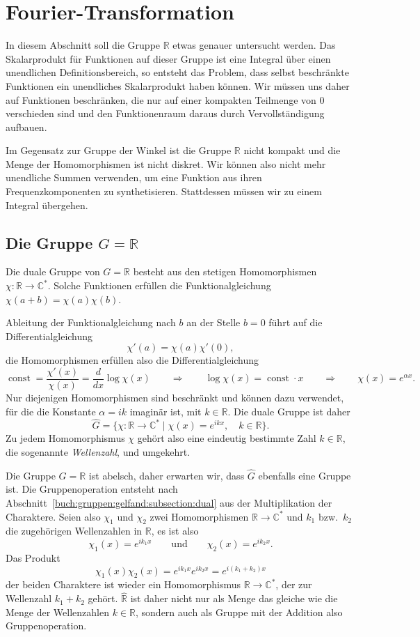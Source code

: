 %
%
%
\section{Fourier-Transformation
\label{buch:gruppen:section:fourier}}
In diesem Abschnitt soll die Gruppe $\mathbb{R}$ etwas genauer untersucht
werden.
Das Skalarprodukt für Funktionen auf dieser Gruppe ist eine Integral über
einen unendlichen Definitionsbereich, so entsteht das Problem, dass
selbst beschränkte Funktionen ein unendliches Skalarprodukt haben können.
Wir müssen uns daher auf Funktionen beschränken, die nur auf einer
kompakten Teilmenge von $0$ verschieden sind und den Funktionenraum
daraus durch Vervollständigung aufbauen.

Im Gegensatz zur Gruppe der Winkel ist die Gruppe $\mathbb{R}$ nicht kompakt
und die Menge der Homomorphismen ist nicht diskret.
Wir können also nicht mehr unendliche Summen verwenden, um eine Funktion
aus ihren Frequenzkomponenten zu synthetisieren.
Stattdessen müssen wir zu einem Integral übergehen.

%
%
\subsection{Die Gruppe $G=\mathbb{R}$
\label{buch:gruppen:fourier:subsection:gruppeR}}
Die duale Gruppe von $G=\mathbb{R}$ besteht aus den stetigen Homomorphismen
$\chi:\mathbb{R}\to\mathbb{C}^*$.
Solche Funktionen erfüllen die Funktionalgleichung $\chi(a+b)=\chi(a)\chi(b)$.

Ableitung der Funktionalgleichung nach $b$ an der Stelle $b=0$ führt auf
die Differentialgleichung
\[
\chi'(a) = \chi(a)\chi'(0),
\]
die Homomorphismen erfüllen also die Differentialgleichung
\[
\operatorname{const}
=
\frac{\chi'(x)}{\chi(x)} 
=
\frac{d}{dx}\log\chi(x)
\qquad\Rightarrow\qquad
\log\chi(x) = \operatorname{const}\cdot x
\qquad\Rightarrow\qquad
\chi(x) = e^{\alpha x}.
\]
Nur diejenigen Homomorphismen sind beschränkt und können dazu verwendet,
für die die Konstante $\alpha=ik$ imaginär ist, mit $k\in\mathbb{R}$.
Die duale Gruppe ist daher
\[
\hat{G}
=
\{
\chi\colon\mathbb{R}\to\mathbb{C}^*
\mid
\chi(x) = e^{ikx},\quad k\in \mathbb{R}
\}.
\]
Zu jedem Homomorphismus $\chi$ gehört also eine eindeutig bestimmte
Zahl $k\in\mathbb{R}$, die sogenannte {\em Wellenzahl},
%
und umgekehrt.

Die Gruppe $G=\mathbb{R}$ ist abelsch, daher erwarten wir, dass 
$\hat{G}$ ebenfalls eine Gruppe ist.
Die Gruppenoperation entsteht nach
Abschnitt~\ref{buch:gruppen:gelfand:subsection:dual} aus der 
Multiplikation der Charaktere.
Seien also $\chi_1$ und $\chi_2$ zwei Homomorphismen
$\mathbb{R}\to\mathbb{C}^*$ und $k_1$ bzw.~$k_2$ die zugehörigen
Wellenzahlen in $\mathbb{R}$, es ist also
\[
\chi_1(x) = e^{ik_1x}
\qquad\text{und}\qquad
\chi_2(x) = e^{ik_2x}.
\]
Das Produkt
\[
\chi_1(x)\chi_2(x)
=
e^{ik_1x}e^{ik_2x}
=
e^{i(k_1+k_2)x}
\]
der beiden Charaktere ist wieder ein Homomorphismus
$\mathbb{R}\to\mathbb{C}^*$, der zur Wellenzahl $k_1+k_2$ gehört.
$\hat{\mathbb{R}}$ ist daher nicht nur als Menge das gleiche wie
die Menge der Wellenzahlen $k\in \mathbb{R}$, sondern auch als
Gruppe mit der Addition also Gruppenoperation.

